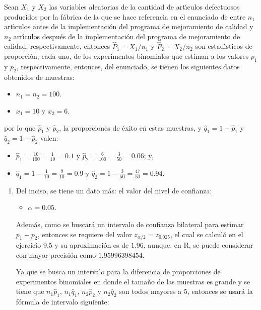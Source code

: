 \begin{solucion}
 Sean $X_1$ y $X_2$ las variables aleatorias de la cantidad de art\'{\i}culos defectuosos producidos por la f\'abrica de la que se hace referencia en el enunciado de entre $n_1$ art\'{\i}culos antes de la implementaci\'on del programa de mejoramiento de calidad y $n_2$ art\'{\i}culos despu\'es de la implementaci\'on del programa de mejoramiento de calidad, respectivamente, entonces $\widehat{P}_1 = X_1/n_1$ y $\widehat{P}_2 = X_2/n_2$ son estad\'{\i}sticos de proporci\'on, cada uno, de los experimentos binomiales que estiman a los valores $p_1$ y $p_2$, respectivamente, entonces, del enunciado, se tienen los siguientes datos obtenidos de muestras:
 \begin{itemize}
  \item $n_1 = n_2 = 100$.
  \item $x_1 = 10$ y $x_2 = 6$.
 \end{itemize}
 por lo que $\hat{p}_1$ y $\hat{p}_2$, la proporciones de \'exito en estas muestras, y $\hat{q}_1 = 1 - \hat{p}_1$ y $\hat{q}_2 = 1  - \hat{p}_2$ valen:
 \begin{itemize}
  \item $\hat{p}_1 = \frac{10}{100} = \frac{1}{10} = 0.1$ y $\hat{p}_2 = \frac{6}{100} = \frac{3}{50} = 0.06$; y,
  \item $\hat{q}_1 = 1 - \frac{1}{10} = \frac{9}{10} = 0.9$ y $\hat{q}_2 = 1 - \frac{3}{50} = \frac{47}{50} = 0.94$.
 \end{itemize}
 \begin{enumerate}
  \item Del inciso, se tiene un dato m\'as: el valor del nivel de confianza:
  \begin{itemize}
   \item $\alpha = 0.05$.
  \end{itemize}
  Adem\'as, como se buscar\'a un intervalo de confianza bilateral para estimar $p_1 - p_2$, entonces se requiere del valor $z_{\alpha/2} = z_{0.025}$, el cual se calcul\'o en el ejercicio 9.5 y su aproximaci\'on es de $1.96$, aunque, en R, se puede considerar con mayor precisi\'on como $1.95996398454$.
  \par 
  Ya que se busca un intervalo para la diferencia de proporciones de experimentos binomiales en donde el tama\~no de las muestras es grande y se tiene que $n_1\hat{p}_1$, $n_1\hat{q}_1$, $n_2\hat{p}_2$ y $n_2\hat{q}_2$ son todos mayores a $5$, entonces se usar\'a la f\'ormula de intervalo siguiente:
  \begin{equation*}

\end{equation*}
\end{enumerate}
\end{solucion}
